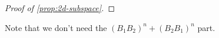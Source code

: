 \documentclass[11pt,letterpaper]{article}
\newcommand{\ket}[1]{|#1\rangle}
\newcommand{\ketbra}[2]{|#1\rangle\langle#2|}
\DeclarePairedDelimiter{\norm}{\lVert}{\rVert}
\renewcommand{\Re}{\operatorname{Re}}
\renewcommand{\Im}{\operatorname{Im}}
\DeclareMathOperator{\spn}{span}
\newcommand{\1}{\mathbb{1}}
\newcommand{\tB}{\tilde{B}}
\newcommand{\tpsi}{\tilde{\psi}}
\theoremstyle{definition}
\begin{document}
\begin{proof}[Proof of \cref{prop:2d-subspace}]
\end{proof}
Note that we don't need the $(B_1B_2)^n + (B_2B_1)^n$ part.
\end{document}
